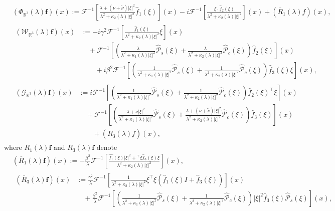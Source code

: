 \documentclass[dvipdfmx,12pt]{article}
\begin{document}
\begin{align}
&\label{R-R3-phi}
(\Phi_{\mathbb{R}^3}(\lambda)\mathbf{f})(x):=\mathcal{F}^{-1}\left[\frac{\lambda+(\nu+\tilde{\nu})|\xi|^2}{\lambda^2+\kappa_2(\lambda)|\xi|^2}\widehat{f}_1(\xi)\right](x) -i\mathcal{F}^{-1}\left[\frac{\xi\cdot\widehat{f}_2(\xi)}{\lambda^2+\kappa_2(\lambda)|\xi|^2}\right](x)+(\overline{R}_1(\lambda)f)(x),
\\
&\label{R-R3-w}
\begin{aligned}
(\mathcal{W}_{\mathbb{R}^3}(\lambda)\mathbf{f})(x)
&:=-i\gamma^2\mathcal{F}^{-1}\left[\frac{\widehat{f}_1(\xi)}{\lambda^2+\kappa_2(\lambda)|\xi|^2}\xi\right](x) \\
&\quad+\mathcal{F}^{-1}\left[\left(\frac{\lambda}{\lambda^2+\kappa_1(\lambda)|\xi|^2}\widehat{\mathcal{P}}_s(\xi)+\frac{\lambda}{\lambda^2+\kappa_2(\lambda)|\xi|^2}\widehat{\mathcal{P}}_c(\xi)\right)\widehat{f}_2(\xi)\right](x)\\
&\qquad +i\beta^2\mathcal{F}^{-1}\left[\left(\frac{1}{\lambda^2+\kappa_1(\lambda)|\xi|^2}\widehat{\mathcal{P}}_s(\xi)+\frac{1}{\lambda^2+\kappa_2(\lambda)|\xi|^2}\widehat{\mathcal{P}}_c(\xi)\right)\widehat{f}_3(\xi)\xi\right](x),
\end{aligned}
\\
&\label{R-R3-G}
\begin{aligned}
(\mathcal{G}_{\mathbb{R}^3}(\lambda)\mathbf{f})(x) 
&:=i\mathcal{F}^{-1}\left[\left(\frac{1}{\lambda^2+\kappa_1(\lambda)|\xi|^2}\widehat{\mathcal{P}}_s(\xi)+\frac{1}{\lambda^2+\kappa_2(\lambda)|\xi|^2}\widehat{\mathcal{P}}_c(\xi)\right)\widehat{f}_2(\xi)^\top\xi\right](x)\\
&\quad +\mathcal{F}^{-1}\left[\left(\frac{\lambda+\nu|\xi|^2}{\lambda^2+\kappa_1(\lambda)|\xi|^2}\widehat{\mathcal{P}}_s(\xi)+\frac{\lambda+(\nu+\tilde{\nu})|\xi|^2}{\lambda^2+\kappa_2(\lambda)|\xi|^2}\widehat{\mathcal{P}}_c(\xi)\right)\widehat{f}_3(\xi)\right](x)\\
&\qquad+(\overline{R}_3(\lambda)f)(x),
\end{aligned}
\end{align}
where $\overline{R}_1(\lambda)\mathbf{f}$ and $\overline{R}_3(\lambda)\mathbf{f}$ denote
\begin{align*}
&(\overline{R}_1(\lambda)\mathbf{f})(x):=-\frac{\beta^2}{\lambda}\mathcal{F}^{-1}\left[\frac{\widehat{f_1}(\xi)|\xi|^2+{}^\top\xi\widehat{f}_3(\xi)\xi}{\lambda^2+\kappa_2(\lambda)|\xi|^2}\right](x),\\
&
\begin{aligned}
(\overline{R}_3(\lambda)\mathbf{f})(x) 
&:=\frac{\gamma^2}{\lambda}\mathcal{F}^{-1}\left[\frac{1}{\lambda^2+\kappa_2(\lambda)|\xi|^2}\xi^\top \xi(\widehat{f}_1(\xi)I+\widehat{f}_3(\xi))\right](x) \\
&\quad +\frac{\beta^2}{\lambda}\mathcal{F}^{-1}\left[\left(\frac{1}{\lambda^2+\kappa_1(\lambda)|\xi|^2}\widehat{\mathcal{P}}_s(\xi)+\frac{1}{\lambda^2+\kappa_2(\lambda)|\xi|^2}\widehat{\mathcal{P}}_c(\xi)\right)|\xi|^2\widehat{f}_3(\xi)\widehat{\mathcal{P}}_s(\xi)\right](x),
\end{aligned}
\end{align*}
\end{document}
